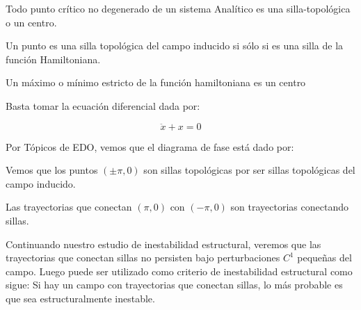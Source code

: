 \begin{thm}
	Todo punto crítico no degenerado de un sistema Analítico es una silla-topológica o un centro. 
	
	Un punto es una silla topológica del campo inducido si sólo si es una silla de la función Hamiltoniana.
	
	Un máximo o mínimo estricto de la función hamiltoniana es un centro
\end{thm}

\begin{exmp}
	Basta tomar la ecuación diferencial  dada por:
	
	\begin{equation*}
		\ddot{x} + x = 0
	\end{equation*}
	
	Por Tópicos de EDO, vemos que el diagrama de fase está dado por:
	
	
	
	Vemos que los puntos $(\pm \pi,0)$ son sillas topológicas por ser sillas topológicas del campo inducido. 
	
	Las trayectorias que conectan $(\pi,0)$ con $(-\pi,0)$ son trayectorias conectando sillas.
\end{exmp}

\begin{rmrk}
	Continuando nuestro estudio de inestabilidad estructural, veremos que las trayectorias que conectan sillas no persisten bajo perturbaciones $C^1$ pequeñas del campo. Luego puede ser utilizado como criterio de inestabilidad estructural como sigue:  Si hay un campo con trayectorias que conectan sillas, lo más probable es que sea estructuralmente inestable.
\end{rmrk}

